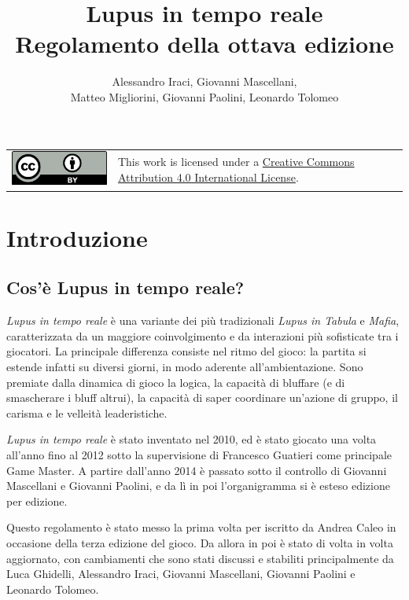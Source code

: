 \documentclass[a4paper,10pt]{article}
\title{Lupus in tempo reale\\ Regolamento della ottava edizione}
\author{Alessandro Iraci, Giovanni Mascellani,\\ Matteo Migliorini, Giovanni Paolini, Leonardo Tolomeo}
\begin{document}
	
\maketitle

\begin{tabular}{lp{}}
	\begin{minipage}{0.22\textwidth}
		\vspace{3mm}
		\href{http://creativecommons.org/licenses/by/4.0/}{\includegraphics{ccby.pdf}}
	\end{minipage}
	&
	This work is licensed under a \href{http://creativecommons.org/licenses/by/4.0/}{Creative Commons Attribution 4.0 International License}.
\end{tabular}


\section{Introduzione}

\subsection{Cos'è Lupus in tempo reale?}

\emph{Lupus in tempo reale} è una variante dei più tradizionali \emph{Lupus in Tabula} e \emph{Mafia}, caratterizzata da un maggiore coinvolgimento e da interazioni più sofisticate tra i giocatori.
La principale differenza consiste nel ritmo del gioco: la partita si estende infatti su diversi giorni, in modo aderente all'ambientazione.
Sono premiate dalla dinamica di gioco la logica, la capacità di bluffare (e di smascherare i bluff altrui), la capacità di saper coordinare un’azione di gruppo, il carisma e le velleità leaderistiche.

\emph{Lupus in tempo reale} è stato inventato nel 2010, ed è stato giocato una volta all'anno fino al 2012 sotto la supervisione di Francesco Guatieri come principale Game Master. A partire dall'anno 2014 è passato sotto il controllo di Giovanni Mascellani e Giovanni Paolini, e da lì in poi l'organigramma si è esteso edizione per edizione.

Questo regolamento è stato messo la prima volta per iscritto da Andrea Caleo in occasione della terza edizione del gioco. Da allora in poi è stato di volta in volta aggiornato, con cambiamenti che sono stati discussi e stabiliti principalmente da Luca Ghidelli, Alessandro Iraci, Giovanni Mascellani, Giovanni Paolini e Leonardo Tolomeo.
\end{document}
